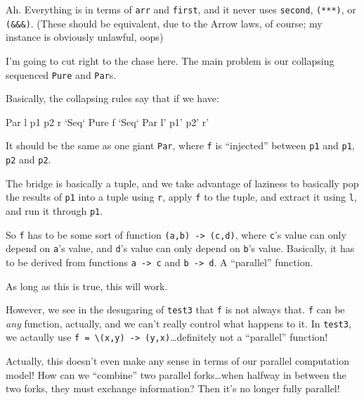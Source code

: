 \documentclass[]{article}
\newenvironment{Shaded}{}{}
\newcommand{\DataTypeTok}[1]{\textcolor[rgb]{0.56,0.13,0.00}{{#1}}}
\newcommand{\OtherTok}[1]{\textcolor[rgb]{0.00,0.44,0.13}{{#1}}}
\newcommand{\NormalTok}[1]{{#1}}
\begin{document}
Ah. Everything is in terms of \texttt{arr} and \texttt{first}, and it never uses
\texttt{second}, \texttt{(***)}, or \texttt{(\&\&\&)}. (These should be
equivalent, due to the Arrow laws, of course; my instance is obviously unlawful,
oops)

I'm going to cut right to the chase here. The main problem is our collapsing
sequenced \texttt{Pure} and \texttt{Par}s.

Basically, the collapsing rules say that if we have:

\begin{Shaded}
\begin{Highlighting}[]
\DataTypeTok{Par} \NormalTok{l p1 p2 r }\OtherTok{`Seq`} \DataTypeTok{Pure} \NormalTok{f }\OtherTok{`Seq`} \DataTypeTok{Par} \NormalTok{l' p1' p2' r'}
\end{Highlighting}
\end{Shaded}

It should be the same as one giant \texttt{Par}, where \texttt{f} is
``injected'' between \texttt{p1} and \texttt{p1\textquotesingle{}}, \texttt{p2}
and \texttt{p2\textquotesingle{}}.

The bridge is basically a tuple, and we take advantage of laziness to basically
pop the results of \texttt{p1} into a tuple using \texttt{r}, apply \texttt{f}
to the tuple, and extract it using \texttt{l}, and run it through
\texttt{p1\textquotesingle{}}.

So \texttt{f} has to be some sort of function
\texttt{(a,b)\ -\textgreater{}\ (c,d)}, where \texttt{c}'s value can only depend
on \texttt{a}'s value, and \texttt{d}'s value can only depend on \texttt{b}'s
value. Basically, it has to be derived from functions
\texttt{a\ -\textgreater{}\ c} and \texttt{b\ -\textgreater{}\ d}. A
``parallel'' function.

As long as this is true, this will work.

However, we see in the desugaring of \texttt{test3} that \texttt{f} is not
always that. \texttt{f} can be \emph{any} function, actually, and we can't
really control what happens to it. In \texttt{test3}, we actaully use
\texttt{f\ =\ \textbackslash{}(x,y)\ -\textgreater{}\ (y,x)}\ldots{}definitely
not a ``parallel'' function!

Actually, this doesn't even make any sense in terms of our parallel computation
model! How can we ``combine'' two parallel forks\ldots{}when halfway in between
the two forks, they must exchange information? Then it's no longer fully
parallel!
\end{document}
